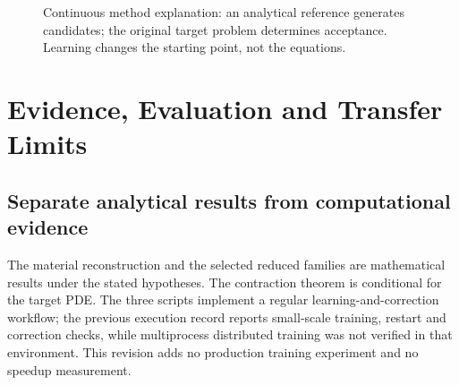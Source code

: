 \documentclass[12pt,a4paper,oneside]{report}
\numberwithin{equation}{chapter}
\theoremstyle{remark}\newtheorem{remark}[theorem]{Remark}
\begin{document}
\begin{figure}[htbp]\centering
{}
\caption[Continuous correction and validation workflow]{Continuous method explanation: an analytical reference generates candidates; the original target problem determines acceptance. Learning changes the starting point, not the equations.}
\end{figure}
\chapter{Evidence, Evaluation and Transfer Limits}\label{ch:computation}
\section{Separate analytical results from computational evidence}
The material reconstruction and the selected reduced families are mathematical results under the stated hypotheses. The contraction theorem is conditional for the target PDE. The three scripts implement a regular learning-and-correction workflow; the previous execution record reports small-scale training, restart and correction checks, while multiprocess distributed training was not verified in that environment. This revision adds no production training experiment and no speedup measurement.
\end{document}
